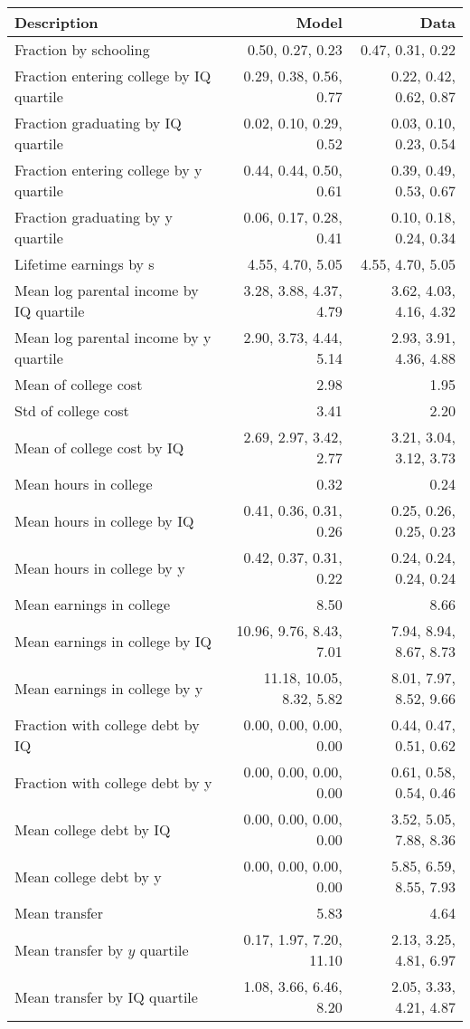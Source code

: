 \begin{tabular}{lrr}
\hline
Description & Model  & Data  \\
\hline
Fraction by schooling & 0.50, 0.27, 0.23  & 0.47, 0.31, 0.22  \\
Fraction entering college by IQ quartile & 0.29, 0.38, 0.56, 0.77  & 0.22, 0.42, 0.62, 0.87  \\
Fraction graduating by IQ quartile & 0.02, 0.10, 0.29, 0.52  & 0.03, 0.10, 0.23, 0.54  \\
Fraction entering college by y quartile & 0.44, 0.44, 0.50, 0.61  & 0.39, 0.49, 0.53, 0.67  \\
Fraction graduating by y quartile & 0.06, 0.17, 0.28, 0.41  & 0.10, 0.18, 0.24, 0.34  \\
Lifetime earnings by s & 4.55, 4.70, 5.05  & 4.55, 4.70, 5.05  \\
Mean log parental income by IQ quartile & 3.28, 3.88, 4.37, 4.79  & 3.62, 4.03, 4.16, 4.32  \\
Mean log parental income by y quartile & 2.90, 3.73, 4.44, 5.14  & 2.93, 3.91, 4.36, 4.88  \\
Mean of college cost & 2.98  & 1.95  \\
Std of college cost & 3.41  & 2.20  \\
Mean of college cost by IQ & 2.69, 2.97, 3.42, 2.77  & 3.21, 3.04, 3.12, 3.73  \\
Mean hours in college & 0.32  & 0.24  \\
Mean hours in college by IQ & 0.41, 0.36, 0.31, 0.26  & 0.25, 0.26, 0.25, 0.23  \\
Mean hours in college by y & 0.42, 0.37, 0.31, 0.22  & 0.24, 0.24, 0.24, 0.24  \\
Mean earnings in college & 8.50  & 8.66  \\
Mean earnings in college by IQ & 10.96, 9.76, 8.43, 7.01  & 7.94, 8.94, 8.67, 8.73  \\
Mean earnings in college by y & 11.18, 10.05, 8.32, 5.82  & 8.01, 7.97, 8.52, 9.66  \\
Fraction with college debt by IQ & 0.00, 0.00, 0.00, 0.00  & 0.44, 0.47, 0.51, 0.62  \\
Fraction with college debt by y & 0.00, 0.00, 0.00, 0.00  & 0.61, 0.58, 0.54, 0.46  \\
Mean college debt by IQ & 0.00, 0.00, 0.00, 0.00  & 3.52, 5.05, 7.88, 8.36  \\
Mean college debt by y & 0.00, 0.00, 0.00, 0.00  & 5.85, 6.59, 8.55, 7.93  \\
Mean transfer & 5.83  & 4.64  \\
Mean transfer by $y$ quartile & 0.17, 1.97, 7.20, 11.10  & 2.13, 3.25, 4.81, 6.97  \\
Mean transfer by IQ quartile & 1.08, 3.66, 6.46, 8.20  & 2.05, 3.33, 4.21, 4.87  \\
\hline
\end{tabular}%
